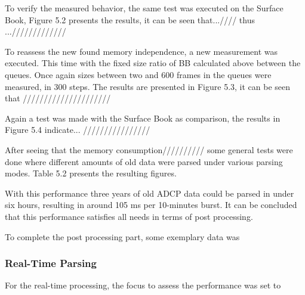 To verify the measured behavior, the same test was executed on the Surface Book, Figure 5.2 presents the results, it can be seen that...//// thus ...///////////// 

To reassess the new found memory independence, a new measurement was executed. This time with the fixed size ratio of BB calculated above between the queues. Once again sizes between two and 600 frames in the queues were measured, in 300 steps. The results are presented in Figure 5.3, it can be seen that ///////////////////// 

Again a test was made with the Surface Book as comparison, the results in Figure 5.4 indicate... ////////////////

After seeing that the memory consumption////////// some general tests were done where different amounts of old data were parsed under various parsing modes. Table 5.2 presents the resulting figures. 

With this performance three years of old ADCP data could be parsed in under six hours, resulting in around 105 ms per 10-minutes burst. It can be concluded that this performance satisfies all needs in terms of post processing.

To complete the post processing part, some exemplary data was 
\subsubsection{Real-Time Parsing} 
For the real-time processing, the focus to assess the performance was set to 
